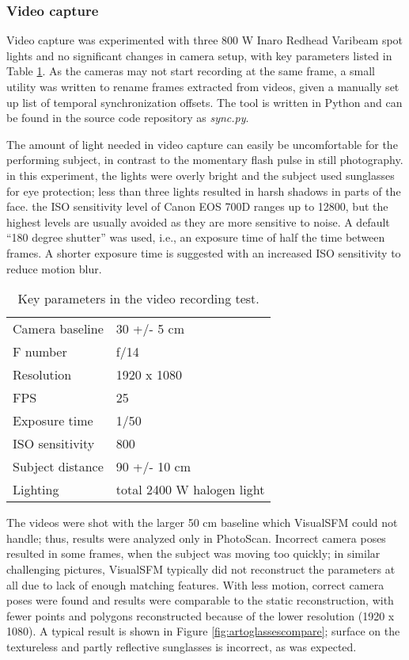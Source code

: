 \afterpage{\clearpage}
\subsubsection{Video capture}


Video capture was experimented with three 800 W Inaro Redhead Varibeam spot lights and no significant changes in camera setup, with key parameters listed in Table \ref{tab:samplevideoparams}.
As the cameras may not start recording at the same frame, a small utility was written to rename frames extracted from videos, given a manually set up list of temporal synchronization offsets.
The tool is written in Python and can be found in the source code repository as \emph{sync.py}.

The amount of light needed in video capture can easily be uncomfortable for the performing subject, in contrast to the momentary flash pulse in still photography.
in this experiment, the lights were overly bright and the subject used sunglasses for eye protection; less than three lights resulted in harsh shadows in parts of the face.
the ISO sensitivity level of Canon EOS 700D ranges up to 12800, but the highest levels are usually avoided as they are more sensitive to noise.
A default ``180 degree shutter'' was used, i.e., an exposure time of half the time between frames.
A shorter exposure time is suggested with an increased ISO sensitivity to reduce motion blur.

\begin{table}[b]
	\centering
	\begin{tabular}{l l}
		Camera baseline & 30 +/- 5 cm\\
		F number & f/14\\
		Resolution & 1920 x 1080\\
		FPS & 25\\
		Exposure time & 1/50\\
		ISO sensitivity & 800\\
		Subject distance & 90 +/- 10 cm\\
		Lighting & total 2400 W halogen light\\
	\end{tabular}
	\caption{
		Key parameters in the video recording test.
	}
	\label{tab:samplevideoparams}
\end{table}

The videos were shot with the larger 50 cm baseline which VisualSFM could not handle; thus, results were analyzed only in PhotoScan.
Incorrect camera poses resulted in some frames, when the subject was moving too quickly; in similar challenging pictures, VisualSFM typically did not reconstruct the parameters at all due to lack of enough matching features.
With less motion, correct camera poses were found and results were comparable to the static reconstruction, with fewer points and polygons reconstructed because of the lower resolution (1920 x 1080).
A typical result is shown in Figure \ref{fig:artoglassescompare}; surface on the textureless and partly reflective sunglasses is incorrect, as was expected.

